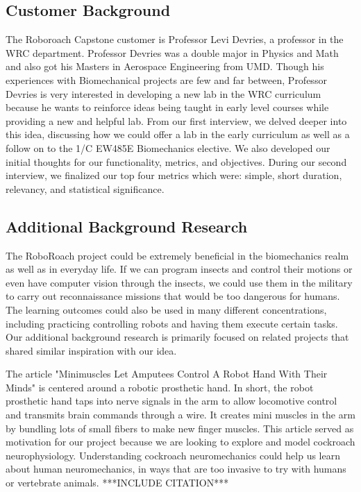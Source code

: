 \documentclass{article}
\begin{document}
\subsection{Customer Background}
\par The Roboroach Capstone customer is Professor Levi Devries, a professor in the WRC department. Professor Devries was a double major in Physics and Math and also got his Masters in Aerospace Engineering from UMD. Though his experiences with Biomechanical projects are few and far between, Professor Devries is very interested in developing a new lab in the WRC curriculum because he wants to reinforce ideas being taught in early level courses while providing a new and helpful lab. From our first interview, we delved deeper into this idea, discussing how we could offer a lab in the early curriculum as well as a follow on to the 1/C EW485E Biomechanics elective. We also developed our initial thoughts for our functionality, metrics, and objectives. During our second interview, we finalized our top four metrics which were: simple, short duration, relevancy, and statistical significance. 

\subsection{Additional Background Research}

\par The RoboRoach project could be extremely beneficial in the biomechanics realm as well as in everyday life. If we can program insects and control their motions or even have computer vision through the insects, we could use them in the military to carry out reconnaissance missions that would be too dangerous for humans. The learning outcomes could also be used in many different concentrations, including practicing controlling robots and having them execute certain tasks. Our additional background research is primarily focused on related projects that shared similar inspiration with our idea. 

\bigskip

\par The article "Minimuscles Let Amputees Control A Robot Hand With Their Minds" is centered around a robotic prosthetic hand. 
In short, the robot prosthetic hand taps into nerve signals in the arm to allow locomotive control and transmits brain commands through a wire. It creates mini muscles in the arm by bundling lots of small fibers to make new finger muscles. This article served as motivation for our project because we are looking to explore and model cockroach neurophysiology. Understanding cockroach neuromechanics could help us learn about human neuromechanics, in ways that are too invasive to try with humans or vertebrate animals. ***INCLUDE CITATION***
\end{document}
